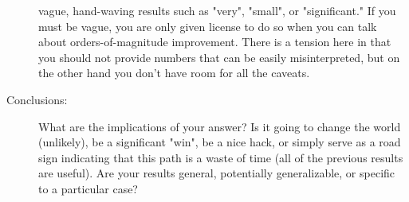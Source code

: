 \begin{description}
        vague, hand-waving results such as "very", "small", or "significant." If you
        must be vague, you are only given license to do so when you can talk about
        orders-of-magnitude improvement. There is a tension here in that you should not
        provide numbers that can be easily misinterpreted, but on the other hand you
        don't have room for all the caveats.
  \item[Conclusions:] What are the implications of your answer? Is it going to change
        the world (unlikely), be a significant "win", be a nice hack, or simply serve
        as a road sign indicating that this path is a waste of time (all of the
        previous results are useful). Are your results general, potentially
        generalizable, or specific to a particular case?

\end{description}

\smallskip

